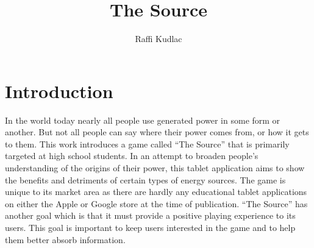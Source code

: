\documentclass[msc,oneside]{ubcthesis}%
\title{The Source}
\author{Raffi Kudlac} %
\begin{document}
\frontmatter                    %

\maketitle                      %

\newpage
{} \label{tableofcontent}%
\tableofcontents                %
\newpage 
{} \label{listoftab}%
\listoftables                   %
\newpage
{} \label{listoffig}%
\listoffigures                  %


\mainmatter


\chapter{Introduction}

  In the world today nearly all people use generated power in some form or another. But not all people can say where their power comes from, or how it gets to them. This work introduces a game called ``The Source'' that is primarily targeted at high school students. In an attempt to broaden people's understanding of the origins of their power, this tablet application aims to show the benefits and detriments of certain types of energy sources. The game is unique to its market area as there are hardly any educational tablet applications on either the Apple or Google store at the time of publication. ``The Source'' has another goal which is that it must provide a positive playing experience to its users. This goal is important to keep users interested in the game and to help them better absorb information. 
\end{document}
